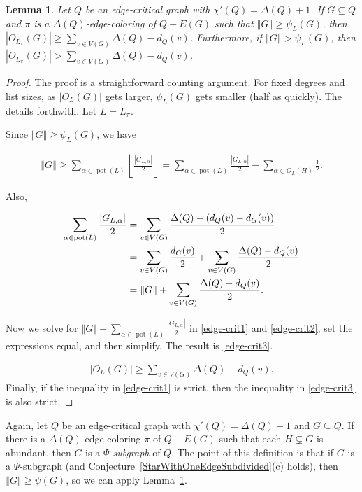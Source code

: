 \documentclass[12pt]{article}
\theoremstyle{plain}
\newtheorem{lem}[thm]{Lemma}
\theoremstyle{definition}
\theoremstyle{remark}
\newcommand{\card}[1]{\left|#1\right|}
\newcommand{\size}[1]{\left\Vert#1\right\Vert}
\newcommand{\floor}[1]{\left\lfloor#1\right\rfloor}
\newcommand{\pot}{\operatorname{pot}}
\begin{document}
\begin{lem}\label{LowPsiGivesManyOddColors}
Let $Q$ be an edge-critical graph with $\chi'(Q) = \Delta(Q) + 1$. If $G
\subseteq Q$ and $\pi$ is a $\Delta(Q)$-edge-coloring of $Q - E(G)$ such that
$\size{G}\ge \psi_L(G) $, then $\card{O_{L_\pi}(G)} \ge \sum_{v \in V(G)}
\Delta(Q) - d_Q(v)$.  Furthermore, if $\size{G} > \psi_L(G)$, then
$\card{O_{L_\pi}(G)} > \sum_{v \in V(G)} \Delta(Q) - d_Q(v)$.
\end{lem}
\begin{proof}
The proof is a straightforward counting argument.  For fixed degrees and list
sizes, as $\card{O_L(G)}$ gets larger, $\psi_L(G)$ gets smaller (half as
quickly).  The details forthwith.  Let $L = L_\pi$.

Since $\size{G} \ge \psi_L(G)$, we have 

\begin{align}
\label{edge-crit1}
\size{G} \ge 
\sum_{\alpha \in \pot(L)} \floor{\frac{\card{G_{L, \alpha}}}{2}}  =
\sum_{\alpha \in \pot(L)} \frac{\card{G_{L, \alpha}}}{2} -  \sum_{\alpha \in
	O_L(H)} \frac12 
.\end{align}
	
\noindent 
Also,

\begin{align}
\sum_{\alpha \in \pot(L)} \frac{\card{G_{L, \alpha}}}{2} 
&= \sum_{v \in V(G)} \frac{\Delta(Q) - (d_Q(v)-d_G(v))}{2} \notag\\
&= \sum_{v \in V(G)} \frac{d_G(v)}{2} + \sum_{v \in V(G)} \frac{\Delta(Q) -
d_Q(v)}{2}\notag\\
&= \size{G} +  \sum_{v \in V(G)} \frac{\Delta(Q) - d_Q(v)}{2}.
\label{edge-crit2}
\end{align}
	
\noindent Now we solve for $\size{G}-
\sum_{\alpha \in \pot(L)} \frac{\card{G_{L, \alpha}}}{2}$ in 
\eqref{edge-crit1} and \eqref{edge-crit2}, set the expressions equal, and then
simplify.  The result is \eqref{edge-crit3}.
	
\begin{align}
\card{O_L(G)} \ge \sum_{v \in V(G)} \Delta(Q) - d_Q(v).
\label{edge-crit3}
\end{align}
Finally, if the inequality in \eqref{edge-crit1} is strict, then the inequality
in \eqref{edge-crit3} is also strict.
\end{proof}

Again, let $Q$ be an edge-critical graph with $\chi'(Q) = \Delta(Q) + 1$ and $G
\subseteq Q$.  If there is a $\Delta(Q)$-edge-coloring $\pi$ of $Q - E(G)$ such
that each $H \subsetneq G$ is abundant, then $G$ is a \emph{$\Psi$-subgraph} of
$Q$.  The point of this definition is that if $G$ is a $\Psi$-subgraph (and
Conjecture~\ref{StarWithOneEdgeSubdivided}(c) holds), then $\size{G}\ge
\psi(G)$, so we can apply Lemma~\ref{LowPsiGivesManyOddColors}.
\end{document}
